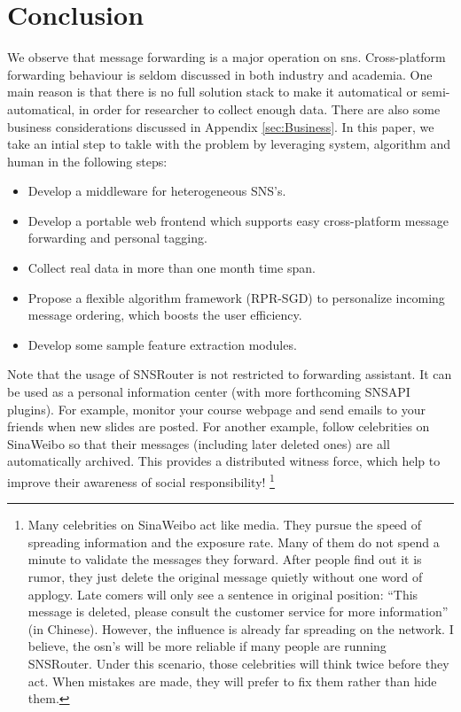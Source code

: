 \documentclass{sig-alternate}
\begin{document}
\section{Conclusion}
\label{sec:Conclusion}

We observe that message forwarding is a major operation on \gls{sns}. 
Cross-platform forwarding behaviour is seldom discussed 
in both industry and academia. 
One main reason is that there is no full solution stack to 
make it automatical or semi-automatical, 
in order for researcher to collect enough data. 
There are also some business considerations discussed in Appendix \ref{sec:Business}.
In this paper, we take an intial step to takle with the problem 
by leveraging system, algorithm and human in the following steps:

\begin{itemize}
	\item Develop a middleware for heterogeneous SNS's. 
	\item Develop a portable web frontend which supports 
		easy cross-platform message forwarding and personal tagging. 
	\item Collect real data in more than one month time span. 
	\item Propose a flexible algorithm framework (RPR-SGD)
		to personalize incoming message ordering, 
		which boosts the user efficiency. 
	\item Develop some sample feature extraction modules. 
\end{itemize}

Note that the usage of SNSRouter is not restricted to forwarding assistant. 
It can be used as a personal information center 
(with more forthcoming SNSAPI plugins). 
For example, monitor your course webpage and send emails 
to your friends when new slides are posted. 
For another example, follow celebrities on SinaWeibo
so that their messages (including later deleted ones) are all automatically archived. 
This provides a distributed witness force, which help to improve 
their awareness of social responsibility!
\footnote{
	Many celebrities on SinaWeibo act like media. 
	They pursue the speed of spreading information and the exposure rate. 
	Many of them do not spend a minute to validate the messages they forward. 
	After people find out it is rumor, 
	they just delete the original message quietly 
	without one word of applogy. 
	Late comers will only see a sentence in original position:
	``This message is deleted, please consult the customer service for more information''
	(in Chinese). 
	However, the influence is already far spreading on the network. 
	I believe, the \gls{osn}'s will be more reliable if many people are running SNSRouter. 
	Under this scenario, those celebrities will think twice before they act. 
	When mistakes are made, they will prefer to fix them rather than hide them. 
}
\end{document}
